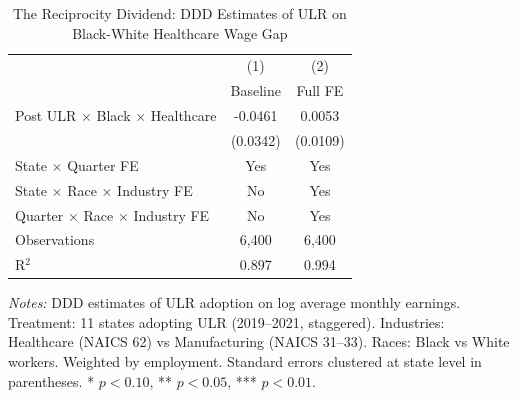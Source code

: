 \begin{table}[t]
\centering
\caption{The Reciprocity Dividend: DDD Estimates of ULR on Black-White Healthcare Wage Gap}
\label{tab:main}
\begin{threeparttable}
\begin{tabular}{lcc}
\toprule
 & (1) & (2) \\
 & Baseline & Full FE \\
\midrule
Post ULR $\times$ Black $\times$ Healthcare & -0.0461 & 0.0053 \\
 & (0.0342) & (0.0109) \\
\midrule
State $\times$ Quarter FE & Yes & Yes \\
State $\times$ Race $\times$ Industry FE & No & Yes \\
Quarter $\times$ Race $\times$ Industry FE & No & Yes \\
Observations & 6,400 & 6,400 \\
R$^2$ & 0.897 & 0.994 \\
\bottomrule
\end{tabular}
\begin{tablenotes}[flushleft]\small
\item \textit{Notes:} DDD estimates of ULR adoption on log average monthly earnings. Treatment: 11 states adopting ULR (2019--2021, staggered). Industries: Healthcare (NAICS 62) vs Manufacturing (NAICS 31--33). Races: Black vs White workers. Weighted by employment. Standard errors clustered at state level in parentheses. * $p<0.10$, ** $p<0.05$, *** $p<0.01$.
\end{tablenotes}
\end{threeparttable}
\end{table}

